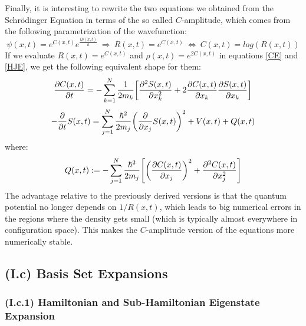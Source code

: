 \documentclass[11pt, a4paper]{article} %
\begin{document}
Finally, it is interesting to rewrite the two equations we obtained from the Schrödinger Equation in terms of the so called $C$-amplitude, which comes from the following parametrization of the wavefunction:
\begin{equation}
\psi(x,t)=e^{C(x,t)}e^{\frac{iS(x,t)}{\hbar}}\ \Longrightarrow\ R(x,t)=e^{C(x,t)} \ \Leftrightarrow \ C(x,t)=log(R(x,t))
\end{equation}
If we evaluate $R(x,t)=e^{C(x,t)}$ and $\rho(x,t)=e^{2C(x,t)}$ in equations \eqref{CE} and \eqref{HJE}, we get the following equivalent shape for them:
\begin{equation}\label{CE.C}
\pdv{C(x,t)}{t} = -\sum_{k=1}^N \frac{1}{2m_k}\qty[\pdv[2]{S(x,t)}{x_k}+2\pdv{C(x,t)}{x_k}\pdv{S(x,t)}{x_k}]
\end{equation}
\begin{equation}\label{HJE.C}
-\pdv{}{t}S(x,t) = \sum_{j=1}^N \frac{\hbar^2}{2m_j} \qty(\pdv{}{x_j} S(x,t) )^2+ V(x,t)+Q(x,t)
\end{equation}
where:
\begin{equation}\label{QP}
Q(x,t):=-\sum_{j=1}^N \frac{\hbar^2}{2m_j}\qty[\qty(\pdv{C(x,t)}{x_j})^2+\pdv[2]{C(x,t)}{x_j}]
\end{equation}
The advantage relative to the previously derived versions is that the quantum potential no longer depends on $1/R(x,t)$, which leads to big numerical errors in the regions where the density gets small (which is typically almost everywhere in configuration space). This makes the $C$-amplitude version of the equations more numerically stable.

\subsection*{(I.c) Basis Set Expansions}
\vspace{-0.4cm}
\subsubsection*{(I.c.1) Hamiltonian and Sub-Hamiltonian Eigenstate Expansion}
\vspace{-0.25cm}
\end{document}
